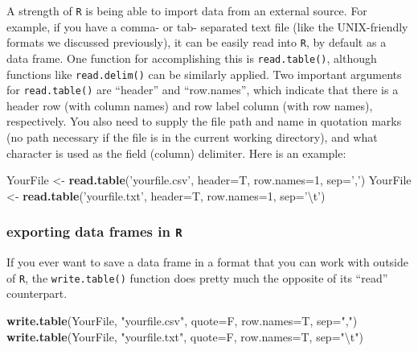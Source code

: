 \documentclass[]{book}
\newenvironment{Shaded}{\begin{snugshade}}{\end{snugshade}}
\newcommand{\CharTok}[1]{\textcolor[rgb]{0.31,0.60,0.02}{#1}}
\newcommand{\DataTypeTok}[1]{\textcolor[rgb]{0.13,0.29,0.53}{#1}}
\newcommand{\DecValTok}[1]{\textcolor[rgb]{0.00,0.00,0.81}{#1}}
\newcommand{\KeywordTok}[1]{\textcolor[rgb]{0.13,0.29,0.53}{\textbf{#1}}}
\newcommand{\NormalTok}[1]{#1}
\newcommand{\StringTok}[1]{\textcolor[rgb]{0.31,0.60,0.02}{#1}}
\begin{document}
A strength of \texttt{R} is being able to import data from an external source. For example, if you have a comma- or tab- separated text file (like the UNIX-friendly formats we discussed previously), it can be easily read into \texttt{R}, by default as a data frame. One function for accomplishing this is \texttt{read.table()}, although functions like \texttt{read.delim()} can be similarly applied. Two important arguments for \texttt{read.table()} are ``header'' and ``row.names'', which indicate that there is a header row (with column names) and row label column (with row names), respectively. You also need to supply the file path and name in quotation marks (no path necessary if the file is in the current working directory), and what character is used as the field (column) delimiter. Here is an example:

\begin{Shaded}
\begin{Highlighting}[]
\NormalTok{YourFile <-}\StringTok{ }\KeywordTok{read.table}\NormalTok{(}\StringTok{'yourfile.csv'}\NormalTok{, }\DataTypeTok{header=}\NormalTok{T, }\DataTypeTok{row.names=}\DecValTok{1}\NormalTok{, }\DataTypeTok{sep=}\StringTok{','}\NormalTok{)}
\NormalTok{YourFile <-}\StringTok{ }\KeywordTok{read.table}\NormalTok{(}\StringTok{'yourfile.txt'}\NormalTok{, }\DataTypeTok{header=}\NormalTok{T, }\DataTypeTok{row.names=}\DecValTok{1}\NormalTok{, }\DataTypeTok{sep=}\StringTok{'}\CharTok{\textbackslash{}t}\StringTok{'}\NormalTok{)}
\end{Highlighting}
\end{Shaded}

\hypertarget{exporting-data-frames-in-r}{%
\subsubsection{\texorpdfstring{exporting data frames in \texttt{R}}{exporting data frames in R}}\label{exporting-data-frames-in-r}}

If you ever want to save a data frame in a format that you can work with outside of \texttt{R}, the \texttt{write.table()} function does pretty much the opposite of its ``read'' counterpart.

\begin{Shaded}
\begin{Highlighting}[]
\KeywordTok{write.table}\NormalTok{(YourFile, }\StringTok{"yourfile.csv"}\NormalTok{, }\DataTypeTok{quote=}\NormalTok{F, }\DataTypeTok{row.names=}\NormalTok{T, }\DataTypeTok{sep=}\StringTok{","}\NormalTok{)}
\KeywordTok{write.table}\NormalTok{(YourFile, }\StringTok{"yourfile.txt"}\NormalTok{, }\DataTypeTok{quote=}\NormalTok{F, }\DataTypeTok{row.names=}\NormalTok{T, }\DataTypeTok{sep=}\StringTok{"}\CharTok{\textbackslash{}t}\StringTok{"}\NormalTok{)}
\end{Highlighting}
\end{Shaded}
\end{document}
